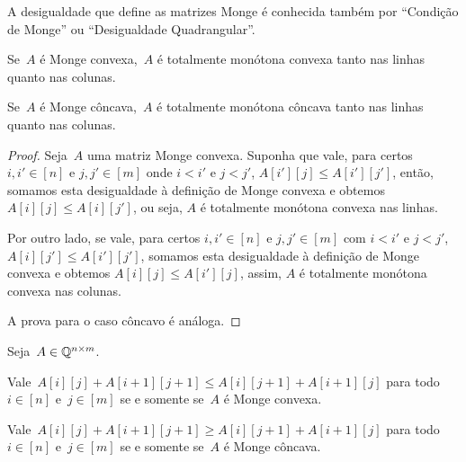 A desigualdade que define as matrizes Monge é conhecida também por ``Condição de Monge'' ou ``Desigualdade Quadrangular''\cite{Yao:1980}\cite{Bein:2009}.

\begin{lema}
Se~$A$ é Monge convexa,~$A$ é totalmente monótona convexa tanto nas linhas quanto nas colunas.  

Se~$A$ é Monge côncava,~$A$ é totalmente monótona côncava tanto nas linhas quanto nas colunas.
\end{lema}

\begin{proof}
Seja~$A$ uma matriz Monge convexa. Suponha que vale, para certos $i,i' \in [n]$ e $j,j' \in [m]$ onde $i < i'$ e $j < j'$, $A[i'][j] \leq A[i'][j']$, então, somamos esta desigualdade à definição de Monge convexa e obtemos $A[i][j] \leq A[i][j']$, ou seja, $A$ é totalmente monótona convexa nas linhas.  

Por outro lado, se vale, para certos $i,i' \in [n]$ e $j,j' \in [m]$ com $i < i'$ e $j < j'$, $A[i][j'] \leq A[i'][j']$, somamos esta desigualdade à definição de Monge convexa e obtemos $A[i][j] \leq A[i'][j]$, assim, $A$ é totalmente monótona convexa nas colunas.  

A prova para o caso côncavo é análoga.
\end{proof}

\begin{theo} \label{Monge:theo+1}
Seja~$A \in \mathbb{Q}^{n \times m}$.

Vale~${A[i][j] + A[i+1][j+1] \leq A[i][j+1] + A[i+1][j]}$ para todo~${i \in [n]}$ e~${j \in [m]}$ se e somente se~$A$ é Monge convexa.

Vale~${A[i][j] + A[i+1][j+1] \geq A[i][j+1] + A[i+1][j]}$ para todo~${i \in [n]}$ e~${j \in [m]}$ se e somente se~$A$ é Monge côncava.
\end{theo}

